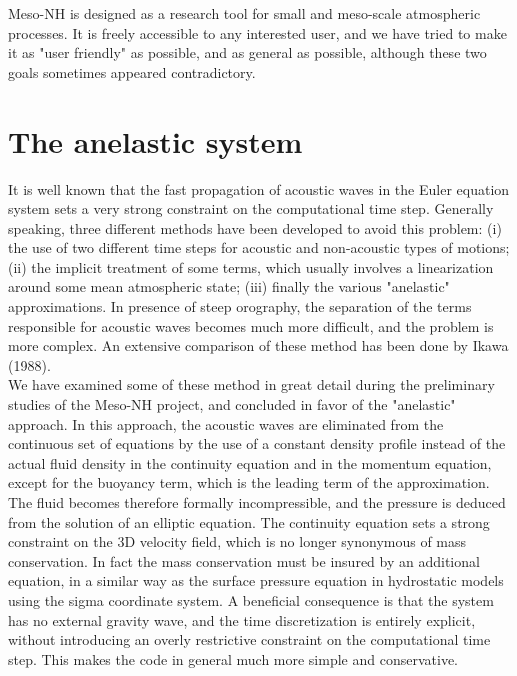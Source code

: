 Meso-NH is designed as a research tool for small and meso-scale atmospheric
processes. It is freely accessible to any interested user, and we have
tried to make it as "user friendly" as possible, and as general as possible,
although these two goals sometimes appeared contradictory.

\section{The anelastic system\label{CHP1anel}}

It is well known that the fast propagation of acoustic waves in the
Euler equation system sets a very strong constraint on the computational
time step. Generally speaking, three different
methods have been developed to avoid this problem: (i) the use of two different
time steps for acoustic and non-acoustic types of motions; (ii) the implicit
treatment of some terms, which usually involves a linearization around some
mean atmospheric state; (iii) finally the various "anelastic" approximations.
In presence of steep orography, the separation of the terms responsible
for acoustic waves becomes much more difficult, and the problem is more
complex. An extensive comparison of these method has been done by Ikawa (1988).
\\

We have examined some of these method in great detail during the
preliminary studies of the Meso-NH project, and concluded in favor of the
"anelastic" approach. In this approach, the acoustic waves are eliminated
from the continuous set of equations by the use of a constant density profile
instead of the actual fluid density in the continuity equation and in the
momentum equation, except for the buoyancy term, which is the leading term
of the approximation. The fluid becomes therefore formally incompressible,
and the pressure is deduced from the solution of an elliptic equation. The
continuity equation sets a strong constraint on the 3D velocity field,
which is no longer synonymous of mass conservation. In fact the mass
conservation must be insured by an additional equation, in a similar way
as the surface pressure equation in hydrostatic models using the sigma
coordinate system. A beneficial consequence is that the system has no
external gravity wave, and the time discretization is entirely explicit,
without introducing an overly restrictive constraint on the computational
time step. This makes the code in general much more simple and conservative.
\\


